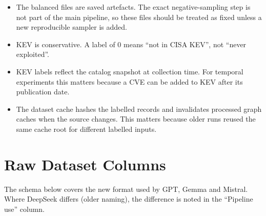 \documentclass[11pt]{article}
\begin{document}
\begin{itemize}
    \item The balanced files are saved artefacts. The exact
    negative-sampling step is not part of the main pipeline, so these
    files should be treated as fixed unless a new reproducible sampler
    is added.
    \item KEV is conservative. A label of $0$ means ``not in CISA
    KEV'', not ``never exploited''.
    \item KEV labels reflect the catalog snapshot at collection time.
    For temporal experiments this matters because a CVE can be added
    to KEV after its publication date.
    \item The dataset cache hashes the labelled records and
    invalidates processed graph caches when the source changes. This
    matters because older runs reused the same cache root for
    different labelled inputs.
\end{itemize}

\section{Raw Dataset Columns}

The schema below covers the new format used by GPT, Gemma and Mistral.
Where DeepSeek differs (older naming), the difference is noted in the
``Pipeline use'' column.
\end{document}
